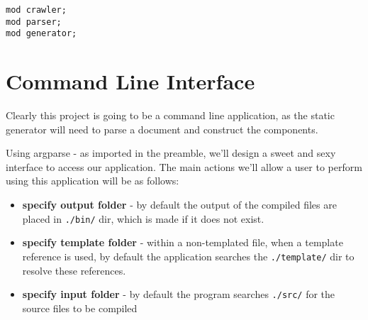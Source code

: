 \documentclass[11pt]{article}
\begin{document}
\begin{verbatim}
mod crawler;
mod parser;
mod generator;
\end{verbatim}

\section{Command Line Interface}
\label{sec:org6938d27}
Clearly this project is going to be a command line application, as the static generator will need to parse a document and construct the components.

Using argparse - as imported in the preamble, we'll design a sweet and sexy interface to access our application. The main actions we'll allow a user to perform using this application will be as follows:
\begin{itemize}
\item \textbf{specify output folder} - by default the output of the compiled files are placed in \texttt{./bin/} dir, which is made if it does not exist.
\item \textbf{specify template folder} - within a non-templated file, when a template reference is used, by default the application searches the 
\texttt{./template/} dir to resolve these references.
\item \textbf{specify input folder} - by default the program searches \texttt{./src/} for the source files to be compiled
\end{itemize}
\end{document}
